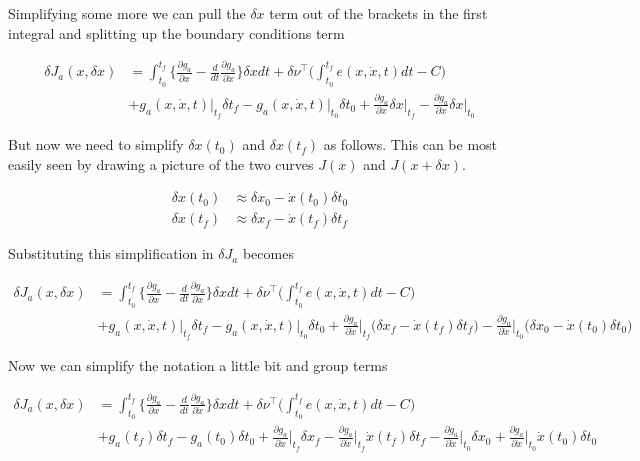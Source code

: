 \documentclass[11pt,letterpaper,onecolumn,notitlepage]{article}
\begin{document}
  Simplifying some more we can pull the $\delta x$ term out of the brackets in the first integral and splitting up the boundary conditions term

  \begin{align*}
    \delta J_{a}(x,\delta x)&=
    \int_{t_{0}}^{t_{f}}\biggr\{\frac{\partial{}g_{a}}{\partial{}x}-\frac{d}{dt}\frac{\partial{}g_{a}}{\partial\dot{x}}\biggr\}\delta xdt
    +\delta\nu^{\top}\biggr(\int_{t_{0}}^{t_{f}}e(x,\dot{x},t)dt-C\biggr) \\
    &+g_{a}(x,\dot{x},t)\biggr|_{t_{f}}\delta t_{f}
    -g_{a}(x,\dot{x},t)\biggr|_{t_{0}}\delta t_{0}
    +\frac{\partial{}g_{a}}{\partial\dot{x}}\delta x\biggr|_{t_{f}}
    -\frac{\partial{}g_{a}}{\partial\dot{x}}\delta x\biggr|_{t_{0}}
  \end{align*}

  But now we need to simplify $\delta x(t_{0})$ and $\delta x(t_{f})$ as follows.
  This can be most easily seen by drawing a picture of the two curves $J(x)$ and $J(x+\delta x)$.

  \begin{align*}
    \delta x(t_{0})&\approx\delta x_{0}-\dot{x}(t_{0})\delta t_{0} \\
    \delta x(t_{f})&\approx\delta x_{f}-\dot{x}(t_{f})\delta t_{f}
  \end{align*}

  Substituting this simplification in $\delta J_{a}$ becomes

  \begin{align*}
    \delta J_{a}(x,\delta x)&=
    \int_{t_{0}}^{t_{f}}\biggr\{\frac{\partial{}g_{a}}{\partial{}x}-\frac{d}{dt}\frac{\partial{}g_{a}}{\partial\dot{x}}\biggr\}\delta xdt
    +\delta\nu^{\top}\biggr(\int_{t_{0}}^{t_{f}}e(x,\dot{x},t)dt-C\biggr) \\
    &+g_{a}(x,\dot{x},t)\biggr|_{t_{f}}\delta t_{f}
    -g_{a}(x,\dot{x},t)\biggr|_{t_{0}}\delta t_{0}
    +\frac{\partial{}g_{a}}{\partial\dot{x}}\biggr|_{t_{f}}\biggr(\delta x_{f}-\dot{x}(t_{f})\delta t_{f}\biggr)
    -\frac{\partial{}g_{a}}{\partial\dot{x}}\biggr|_{t_{0}}\biggr(\delta x_{0}-\dot{x}(t_{0})\delta t_{0}\biggr)
  \end{align*}

  Now we can simplify the notation a little bit and group terms

  \begin{align*}
    \delta J_{a}(x,\delta x)&=
    \int_{t_{0}}^{t_{f}}\biggr\{\frac{\partial{}g_{a}}{\partial{}x}-\frac{d}{dt}\frac{\partial{}g_{a}}{\partial\dot{x}}\biggr\}\delta xdt
    +\delta\nu^{\top}\biggr(\int_{t_{0}}^{t_{f}}e(x,\dot{x},t)dt-C\biggr) \\
    &+g_{a}(t_{f})\delta t_{f}
    -g_{a}(t_{0})\delta t_{0}
    +\frac{\partial{}g_{a}}{\partial\dot{x}}\biggr|_{t_{f}}\delta x_{f}
    -\frac{\partial{}g_{a}}{\partial\dot{x}}\biggr|_{t_{f}}\dot{x}(t_{f})\delta t_{f}
    -\frac{\partial{}g_{a}}{\partial\dot{x}}\biggr|_{t_{0}}\delta x_{0}
    +\frac{\partial{}g_{a}}{\partial\dot{x}}\biggr|_{t_{0}}\dot{x}(t_{0})\delta t_{0}
  \end{align*}
\end{document}
